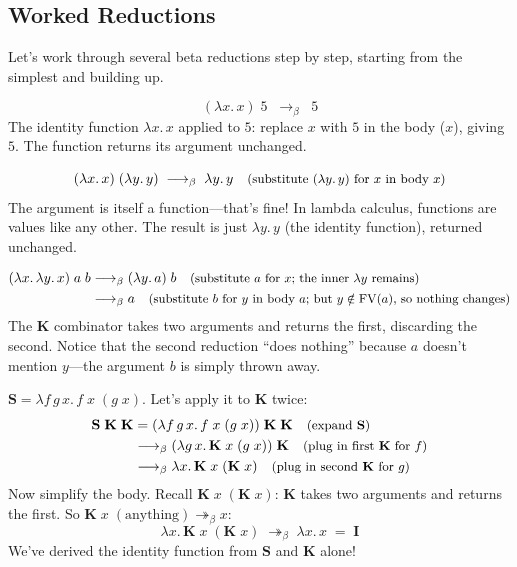 \documentclass[11pt,a4paper]{article}
\theoremstyle{definition}
\newcommand{\lam}{\lambda}
\newcommand{\reduce}{\longrightarrow_\beta}
\newcommand{\reduces}{\twoheadrightarrow_\beta}
\newcommand{\FV}{\operatorname{FV}}
\newcommand{\rmark}[1]{\quad\text{\small(#1)}}
\begin{document}
\subsection{Worked Reductions}

Let's work through several beta reductions step by step, starting from the
simplest and building up.

\begin{workedexample}
\[
  (\lam x.\, x)\; 5 \;\;\reduce\;\; 5
\]
The identity function $\lam x.\, x$ applied to $5$: replace $x$ with $5$ in
the body ($x$), giving $5$. The function returns its argument unchanged.
\end{workedexample}

\begin{workedexample}
\[
  (\lam x.\, x)\;(\lam y.\, y)
    \;\reduce\; \lam y.\, y
    \rmark{substitute $(\lam y.\, y)$ for $x$ in body $x$}
\]
The argument is itself a function---that's fine! In lambda calculus, functions
are values like any other. The result is just $\lam y.\, y$ (the identity
function), returned unchanged.
\end{workedexample}

\begin{workedexample}
\begin{align*}
  (\lam x.\, \lam y.\, x)\; a\; b
    &\reduce (\lam y.\, a)\; b  \rmark{substitute $a$ for $x$; the inner $\lam y$ remains} \\
    &\reduce a                  \rmark{substitute $b$ for $y$ in body $a$; but $y \notin \FV(a)$, so nothing changes}
\end{align*}
The $\mathbf{K}$ combinator takes two arguments and returns the first,
discarding the second. Notice that the second reduction ``does nothing''
because $a$ doesn't mention $y$---the argument $b$ is simply thrown away.
\end{workedexample}

\begin{workedexample}[A multi-step reduction: $\mathbf{S}\;\mathbf{K}\;\mathbf{K} = \mathbf{I}$]
$\mathbf{S} = \lam f\, g\, x.\, f\;x\;(g\;x)$. Let's apply it to $\mathbf{K}$ twice:
\begin{align*}
  \mathbf{S}\;\mathbf{K}\;\mathbf{K}
    &= (\lam f\, g\, x.\, f\;x\;(g\;x))\;\mathbf{K}\;\mathbf{K}
    \rmark{expand $\mathbf{S}$} \\
    &\reduce (\lam g\, x.\, \mathbf{K}\;x\;(g\;x))\;\mathbf{K}
    \rmark{plug in first $\mathbf{K}$ for $f$} \\
    &\reduce \lam x.\, \mathbf{K}\;x\;(\mathbf{K}\;x)
    \rmark{plug in second $\mathbf{K}$ for $g$}
\end{align*}
Now simplify the body. Recall $\mathbf{K}\;x\;(\mathbf{K}\;x)$: $\mathbf{K}$
takes two arguments and returns the first. So $\mathbf{K}\;x\;(\text{anything})
\reduces x$:
\[
  \lam x.\, \mathbf{K}\;x\;(\mathbf{K}\;x)
  \;\reduces\; \lam x.\, x \;=\; \mathbf{I}
\]
We've derived the identity function from $\mathbf{S}$ and $\mathbf{K}$ alone!
\end{workedexample}
\end{document}
